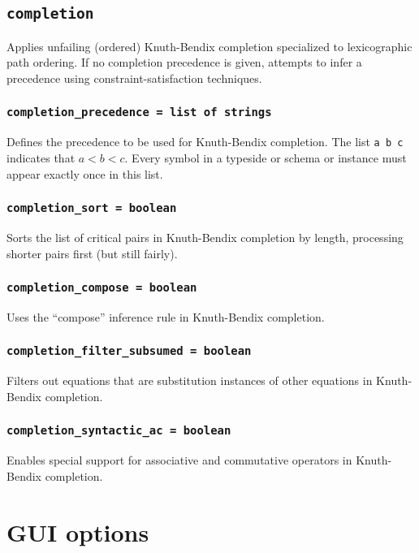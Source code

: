 \documentclass[10pt]{book}
\begin{document}
\subsection{{\tt completion}}

Applies unfailing (ordered) Knuth-Bendix completion specialized to lexicographic path ordering.  If no completion precedence is given, attempts to infer a precedence using constraint-satisfaction techniques.

\subsubsection{{\tt completion\_precedence = list of strings}}

Defines the precedence to be used for Knuth-Bendix completion.  The list {\tt a b c} indicates that $a < b < c$.  Every symbol in a typeside or schema or instance must appear exactly once in this list.

\subsubsection{{\tt completion\_sort = boolean}}

Sorts the list of critical pairs in Knuth-Bendix completion by length, processing shorter pairs first (but still fairly).

\subsubsection{{\tt completion\_compose = boolean}}

Uses the ``compose'' inference rule in Knuth-Bendix completion.

\subsubsection{{\tt completion\_filter\_subsumed = boolean}}

Filters out equations that are substitution instances of other equations in Knuth-Bendix completion.

\subsubsection{{\tt completion\_syntactic\_ac = boolean}}

Enables special support for associative and commutative operators in Knuth-Bendix completion.

\section{GUI options}
\end{document}
